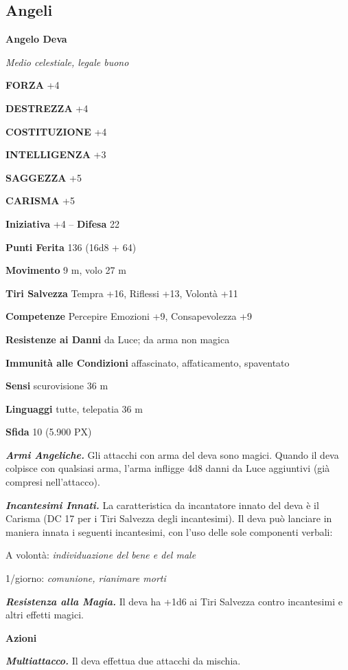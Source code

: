 \begin{multicols}{2}
\subsection{Angeli}

\medskip{}\textbf{Angelo Deva}

\textit{Medio celestiale, legale buono}

\textbf{FORZA} +4

\textbf{DESTREZZA} +4

\textbf{COSTITUZIONE} +4

\textbf{INTELLIGENZA} +3

\textbf{SAGGEZZA} +5

\textbf{CARISMA} +5

\textbf{Iniziativa} +4 -- \textbf{Difesa} 22

\textbf{Punti Ferita} 136 (16d8 + 64)

\textbf{Movimento} 9 m, volo 27 m

\textbf{Tiri Salvezza} Tempra +16, Riflessi +13, Volontà +11

\textbf{Competenze} Percepire Emozioni +9, Consapevolezza +9

\textbf{Resistenze ai Danni} da Luce; da arma non magica

\textbf{Immunità alle Condizioni} affascinato, affaticamento, spaventato

\textbf{Sensi} scurovisione 36 m

\textbf{Linguaggi} tutte, telepatia 36 m

\textbf{Sfida} 10 (5.900 PX)

\textit{\textbf{Armi Angeliche.}} Gli attacchi con arma del deva sono magici. Quando il deva colpisce con qualsiasi arma, l'arma infligge 4d8 danni da Luce aggiuntivi (già compresi nell'attacco).

\textit{\textbf{Incantesimi Innati.}} La caratteristica da incantatore innato del deva è il Carisma (DC 17 per i Tiri Salvezza degli incantesimi). Il deva può lanciare in maniera innata i seguenti incantesimi, con l'uso delle sole componenti verbali:

A volontà: \textit{individuazione del bene e del male}

1/giorno: \textit{comunione, rianimare morti}

\textit{\textbf{Resistenza alla Magia.}} Il deva ha +1d6 ai Tiri Salvezza contro incantesimi e altri effetti magici.

\textbf{Azioni}

\textit{\textbf{Multiattacco.}} Il deva effettua due attacchi da mischia.


\end{multicols}
